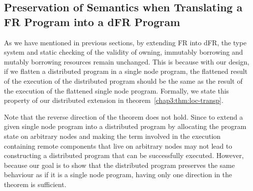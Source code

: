 \subsection{Preservation of Semantics when Translating a FR Program into a dFR Program}
\label{chap3:semantics:loc-transp}
As we have mentioned in previous sections, by extending FR into dFR, the type system and static checking of the validity of owning, immutably borrowing and mutably borrowing resources remain unchanged. This is because with our design, if we flatten a distributed program in a single node program, the flattened result of the execution of the distributed program should be the same as the result of the execution of the flattened single node program. Formally, we state this property of our distributed extension in theorem~\ref{chap3:thm:loc-transp}.

Note that the reverse direction of the theorem does not hold. Since to extend a given single node program into a distributed program by allocating the program state on arbitrary nodes and making the term involved in the execution containing remote components that live on arbitrary nodes may not lead to constructing a distributed program that can be successfully executed. However, because our goal is to show that the distributed program preserves the same behaviour as if it is a single node program, having only one direction in the theorem is sufficient.

